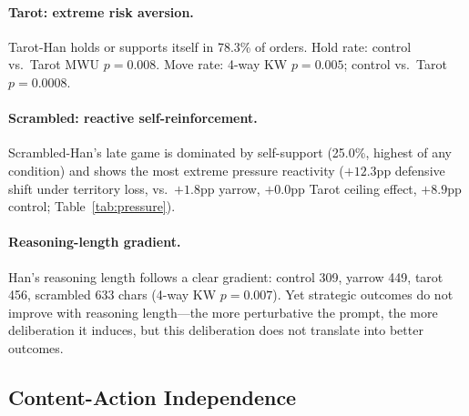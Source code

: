 \documentclass[11pt]{article}
\begin{document}
\paragraph{Tarot: extreme risk aversion.} Tarot-Han holds or supports itself in 78.3\% of orders. Hold rate: control vs.\ Tarot MWU $p = 0.008$. Move rate: 4-way KW $p = 0.005$; control vs.\ Tarot $p = 0.0008$.

\paragraph{Scrambled: reactive self-reinforcement.} Scrambled-Han's late game is dominated by self-support (25.0\%, highest of any condition) and shows the most extreme pressure reactivity ($+12.3$pp defensive shift under territory loss, vs.\ $+1.8$pp yarrow, $+0.0$pp Tarot ceiling effect, $+8.9$pp control; Table~\ref{tab:pressure}).

\paragraph{Reasoning-length gradient.} Han's reasoning length follows a clear gradient: control 309, yarrow 449, tarot 456, scrambled 633 chars (4-way KW $p = 0.007$). Yet strategic outcomes do not improve with reasoning length---the more perturbative the prompt, the more deliberation it induces, but this deliberation does not translate into better outcomes.

\subsection{Content-Action Independence}
\label{sec:content}
\end{document}
